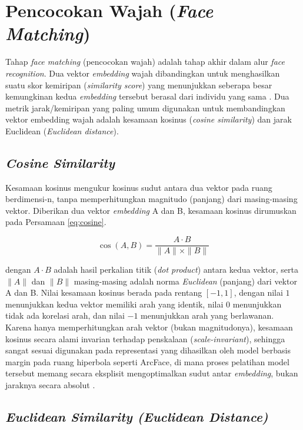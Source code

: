 \section{Pencocokan Wajah (\textit{Face Matching})}

Tahap \textit{face matching} (pencocokan wajah) adalah tahap akhir dalam alur \textit{face recognition}. Dua vektor \textit{embedding} wajah dibandingkan untuk menghasilkan suatu skor kemiripan (\textit{similarity score}) yang menunjukkan seberapa besar kemungkinan kedua \textit{embedding} tersebut berasal dari individu yang sama \autocite{Trigueros2018}. Dua metrik jarak/kemiripan yang paling umum digunakan untuk membandingkan vektor embedding wajah adalah kesamaan kosinus (\textit{cosine similarity}) dan jarak Euclidean (\textit{Euclidean distance}).

\subsection{\textit{Cosine Similarity}}

Kesamaan kosinus mengukur kosinus sudut antara dua vektor pada ruang berdimensi-n, tanpa memperhitungkan magnitudo (panjang) dari masing-masing vektor. Diberikan dua vektor \textit{embedding} A dan B, kesamaan kosinus dirumuskan pada Persamaan \ref{eq:cosine}.

\begin{equation}
\cos(A, B) = \frac{A \cdot B}{\|A\| \times \|B\|}
\label{eq:cosine}
\end{equation}

dengan $A \cdot B$ adalah hasil perkalian titik (\textit{dot product}) antara kedua vektor, serta $\|A\|$ dan $\|B\|$ masing-masing adalah norma \textit{Euclidean} (panjang) dari vektor A dan B. Nilai kesamaan kosinus berada pada rentang $[-1, 1]$, dengan nilai $1$ menunjukkan kedua vektor memiliki arah yang identik, nilai $0$ menunjukkan tidak ada korelasi arah, dan nilai $-1$ menunjukkan arah yang berlawanan. Karena hanya memperhitungkan arah vektor (bukan magnitudonya), kesamaan kosinus secara alami invarian terhadap penskalaan (\textit{scale-invariant}), sehingga sangat sesuai digunakan pada representasi yang dihasilkan oleh model berbasis margin pada ruang hiperbola seperti ArcFace, di mana proses pelatihan model tersebut memang secara eksplisit mengoptimalkan sudut antar \textit{embedding}, bukan jaraknya secara absolut \autocite{deng2019arcface}.

\subsection{\textit{Euclidean Similarity (Euclidean Distance)}}

